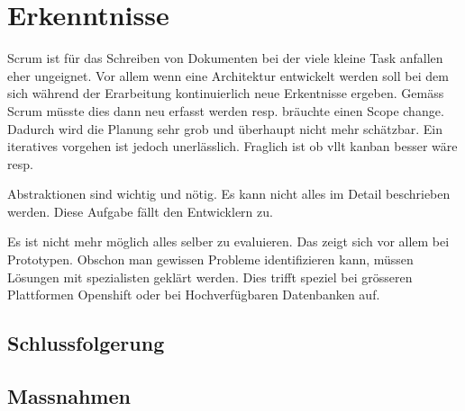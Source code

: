 \chapter{Erkenntnisse}

Scrum ist für das Schreiben von Dokumenten bei der viele kleine Task anfallen eher ungeignet. Vor allem wenn eine Architektur entwickelt werden soll bei dem sich während der Erarbeitung kontinuierlich
neue Erkentnisse ergeben. Gemäss Scrum müsste dies dann neu erfasst werden resp. bräuchte einen Scope change. Dadurch wird die Planung sehr grob und überhaupt nicht mehr schätzbar. Ein iteratives vorgehen ist jedoch unerlässlich. Fraglich ist ob vllt kanban besser wäre resp.

Abstraktionen sind wichtig und nötig. Es kann nicht alles im Detail beschrieben werden. Diese Aufgabe fällt den Entwicklern zu.

Es ist nicht mehr möglich alles selber zu evaluieren. Das zeigt sich vor allem bei Prototypen. Obschon man gewissen Probleme identifizieren kann, müssen Lösungen mit spezialisten geklärt werden. Dies trifft speziel bei grösseren Plattformen Openshift oder bei Hochverfügbaren Datenbanken auf. 

\section{Schlussfolgerung}


\section{Massnahmen}
